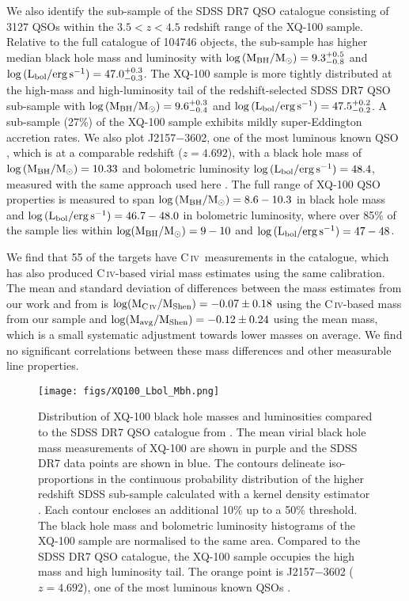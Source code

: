 \documentclass[fleqn,usenatbib]{mnras}
\newcommand{\civ}{C\,\textsc{iv}}
\begin{document}
We also identify the sub-sample of the SDSS DR7 QSO catalogue consisting of 3127 QSOs within the $3.5 < z < 4.5$ redshift range of the XQ-100 sample. Relative to the full catalogue of 104746 objects, the sub-sample has higher median black hole mass and luminosity with $\log{(\rm{M_{BH}}/\rm{M_\odot})} = 9.3^{+0.5}_{-0.8}$ and $\log{(\rm{L_{bol}}/\rm{erg\,s^{-1}})} = 47.0^{+0.3}_{-0.3}$. The XQ-100 sample is more tightly distributed at the high-mass and high-luminosity tail of the redshift-selected SDSS DR7 QSO sub-sample with $\log{(\rm{M_{BH}}/\rm{M_\odot})} = 9.6^{+0.3}_{-0.4}$ and $\log{(\rm{L_{bol}}/\rm{erg\,s^{-1}})} = 47.5^{+0.2}_{-0.2}$. A sub-sample (27\%) of the XQ-100 sample exhibits mildly super-Eddington accretion rates. We also plot J2157$-$3602, one of the most luminous known QSO \citep{onken_2020_J2157}, which is at a comparable redshift ($z = 4.692$), with a black hole mass of $\log{(\rm{M_{BH}}/\rm{M_\odot})} = 10.33$ and bolometric luminosity $\log{(\rm{L_{bol}}/\rm{erg\,s^{-1}})} = 48.4$, measured with the same approach used here \citep{Lai_23_AD}. The full range of XQ-100 QSO properties is measured to span $\log{(\rm{M_{BH}}/\rm{M_\odot})} = 8.6-10.3$ in black hole mass and $\log{(\rm{L_{bol}}/\rm{erg\,s^{-1}})} = 46.7-48.0$ in bolometric luminosity, where over 85\% of the sample lies within $\log(\rm{M_{BH}}/\rm{M_\odot}) = 9-10$ and $\log{(\rm{L_{bol}}/\rm{erg\,s^{-1}})} = 47-48$. 

We find that 55 of the targets have \civ\ measurements in the \citet{Shen_2011} catalogue, which has also produced \civ-based virial mass estimates using the same \citet{Vestergaard_2006} calibration. The mean and standard deviation of differences between the mass estimates from our work and from \citet{Shen_2011} is $\log(\rm{M_{\rm{\civ}}}/\rm{M_{\rm{Shen}}}) = -0.07\pm0.18$ using the \civ-based mass from our sample and $\log(\rm{M_{\rm{avg}}}/\rm{M_{\rm{Shen}}}) = -0.12\pm0.24$ using the mean mass, which is a small systematic adjustment towards lower masses on average. We find no significant correlations between these mass differences and other measurable line properties.

\begin{figure*}
	\texttt{[image: figs/XQ100\_Lbol\_Mbh.png]}
    \caption{Distribution of XQ-100 black hole masses and luminosities compared to the SDSS DR7 QSO catalogue from \citet{Shen_2011}. The mean virial black hole mass measurements of XQ-100 are shown in purple and the SDSS DR7 data points are shown in blue. The contours delineate iso-proportions in the continuous probability distribution of the higher redshift SDSS sub-sample calculated with a kernel density estimator \citep{Waskom2021_seaborn}. Each contour encloses an additional 10\% up to a 50\% threshold. The black hole mass and bolometric luminosity histograms of the XQ-100 sample are normalised to the same area. Compared to the SDSS DR7 QSO catalogue, the XQ-100 sample occupies the high mass and high luminosity tail. The orange point is J2157$-$3602 ($z = 4.692$), one of the most luminous known QSOs \citep{onken_2020_J2157}.}
    \label{fig:XQ100_Lbol_Mbh}
\end{figure*}
\end{document}

